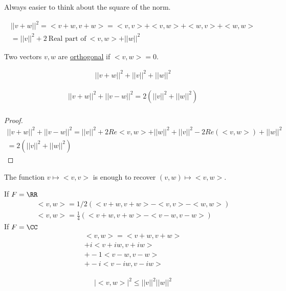 \documentclass[class=scrartcl, crop=false]{standalone}
\begin{document}
\begin{definition}[Properties of $||\ ||$]
  Always easier to think about the square of the norm.
  \begin{enumerate}
    \ii
    \begin{gather*}
      ||v + w||^2 = <v + w, v + w> = <v, v> + <v, w> + <w, v> + <w, w> \\
      = ||v||^2 + 2 \ \text{Real part of} \ <v, w> + ||w||^2
    \end{gather*} 
  \end{enumerate} 
\end{definition} 

\begin{definition}
  Two vectors $v, w$ are \ul{orthogonal} if $<v, w> = 0$.
\end{definition}

\begin{theorem}
  \begin{gather*}
    ||v + w||^2 + ||v||^2 + ||w||^2
  \end{gather*} 
\end{theorem} 


\begin{theorem}
  \begin{gather*}
    ||v + w||^2 + ||v - w||^2 = 2(||v||^2 + ||w||^2) \\
  \end{gather*} 
  \begin{proof}
    \begin{gather*}
      ||v + w||^2 + ||v - w||^2 = ||v||^2 + 2Re<v, w> + ||w||^2 + ||v||^2 - 2Re(<v, w>) + ||w||^2 \\
      = 2(||v||^2 + ||w||^2)
    \end{gather*} 
  \end{proof} 
\end{theorem} 

\begin{theorem}
  The function $v \mapsto <v, v>$ is enough to recover $(v, w) \mapsto <v, w>$.
  \begin{enumerate}
    \ii
    If $F = \RR$
    \begin{gather*}
      <v, w> = 1/2(<v + w, v + w> - <v, v> - <w, w>) \\
      <v, w> = \frac{1}{4}(<v + w, v + w> - <v - w, v - w>) %
    \end{gather*} 
    \ii
    If $F = \CC$ 
    \begin{gather*}
      <v, w> = <v + w, v + w> \\
      + i<v + iw, v + iw> \\
      + -1<v - w, v - w> \\
      + -i<v - iw, v - iw>
    \end{gather*} 
  \end{enumerate} 
\end{theorem} 

\begin{theorem}
  \begin{gather*}
    |<v, w>|^2 \leq ||v||^2||w||^2
  \end{gather*} 
\end{theorem} 
\end{document}
